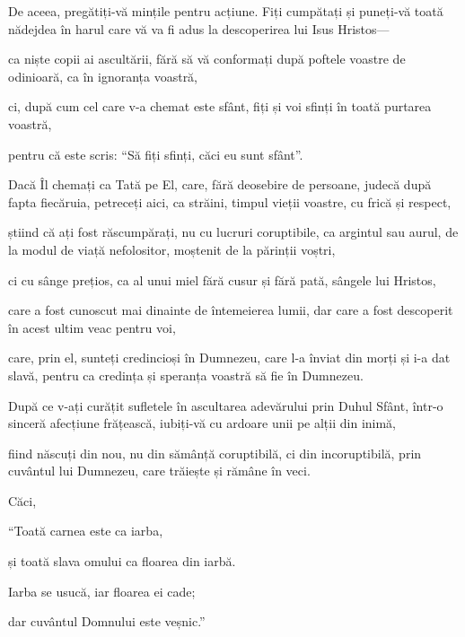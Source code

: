 {\par }{\PP {}De aceea, pregătiți-vă mințile pentru acțiune. Fiți cumpătați și puneți-vă toată nădejdea în harul care vă va fi adus la descoperirea lui Isus Hristos—

ca niște copii ai ascultării, fără să vă conformați după poftele voastre de odinioară, ca în ignoranța voastră,

ci, după cum cel care v-a chemat este sfânt, fiți și voi sfinți în toată purtarea voastră,

pentru că este scris: “Să fiți sfinți, căci eu sunt sfânt”.


\par }{\PP {}Dacă Îl chemați ca Tată pe El, care, fără deosebire de persoane, judecă după fapta fiecăruia, petreceți aici, ca străini, timpul vieții voastre, cu frică și respect,

știind că ați fost răscumpărați, nu cu lucruri coruptibile, ca argintul sau aurul, de la modul de viață nefolositor, moștenit de la părinții voștri,

ci cu sânge prețios, ca al unui miel fără cusur și fără pată, sângele lui Hristos,

care a fost cunoscut mai dinainte de întemeierea lumii, dar care a fost descoperit în acest ultim veac pentru voi,

care, prin el, sunteți credincioși în Dumnezeu, care l-a înviat din morți și i-a dat slavă, pentru ca credința și speranța voastră să fie în Dumnezeu.


\par }{\PP {}După ce v-ați curățit sufletele în ascultarea adevărului prin Duhul Sfânt, într-o sinceră afecțiune frățească, iubiți-vă cu ardoare unii pe alții din inimă,

fiind născuți din nou, nu din sămânță coruptibilă, ci din incoruptibilă, prin cuvântul lui Dumnezeu, care trăiește și rămâne în veci.

Căci,

\par }{\Q “Toată carnea este ca iarba,

\par }{\QB și toată slava omului ca floarea din iarbă.

\par }{\Q Iarba se usucă, iar floarea ei cade;


\par }{\QB {}dar cuvântul Domnului este veșnic.”

}
